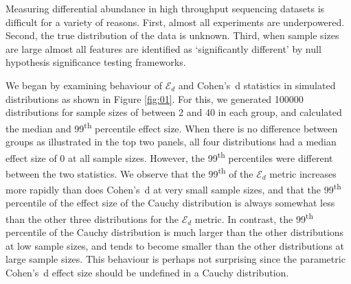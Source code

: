 Measuring differential abundance in high throughput sequencing datasets is difficult for a variety of reasons. First, almost all experiments are underpowered. Second, the true distribution of the data is unknown. Third, when sample sizes are large almost all features are identified as `significantly different' by null hypothesis significance testing frameworks. 

We began by examining behaviour of   $\mathcal{E}_{d}$ and Cohen's~d statistics in simulated distributions as shown in Figure \ref{fig:01}. For this, we generated 100000 distributions for sample sizes  of between 2 and 40 in each group, and calculated the median and 99\textsuperscript{th} percentile effect size. When there is no difference between groups as illustrated in the top two panels, all four distributions had a median effect size of 0 at all sample sizes. However, the  99\textsuperscript{th} percentiles were different between the two statistics. We observe that the 99\textsuperscript{th} of the $\mathcal{E}_{d}$ metric increases more rapidly than does Cohen's~d at very small sample sizes, and that the  99\textsuperscript{th} percentile of the effect size of the Cauchy distribution is always somewhat less than the other three distributions for the $\mathcal{E}_{d}$ metric. In contrast, the  99\textsuperscript{th} percentile of the Cauchy distribution is much larger than the other distributions at low sample sizes, and tends to become smaller than the other distributions at large sample sizes. This behaviour is perhaps not surprising since the parametric Cohen's~d effect size should be undefined in a Cauchy distribution. 

